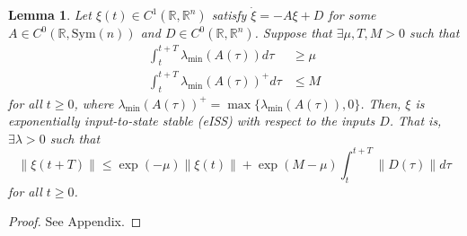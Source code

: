 \documentclass[10pt,a4paper]{amsart}
\newtheorem{lemma}{Lemma}
\newcommand{\R}{\mathbb{R}}
\begin{document}
\begin{lemma}\label{lemma: persistent_excitation}
    Let $\xi(t) \in C^1(\R, \R^n)$ satisfy $\dot{\xi} = -A\xi + D$ for some $A \in C^0(\R, \text{Sym}(n))$ and $D \in C^0(\R, \R^{n})$. Suppose that $\exists \mu, T, M > 0$ such that
    \begin{align}
        \int_t^{t+T} \lambda_{\min}(A(\tau))d\tau &\ge \mu \label{eq: persistent_ex}\\
        \int_t^{t+T} \lambda_{\min}(A(\tau))^+d\tau &\le M \label{eq: spike_limitation}
    \end{align}
    for all $t \ge 0$, where $\lambda_{\min}(A(\tau))^+ = \max\{\lambda_{\min}(A(\tau)), 0\}$. Then, $\xi$ is exponentially input-to-state stable (eISS) with respect to the inputs $D$. That is, $\exists \lambda > 0$ such that
    \begin{equation*}
        \|\xi(t+T)\| \le \exp(-\mu)\|\xi(t)\| + \exp(M-\mu)\int_t^{t+T} \|D(\tau)\|d\tau
    \end{equation*}
    for all $t \ge 0$. 
\end{lemma}

\begin{proof}
    See Appendix.
\end{proof}
\end{document}
